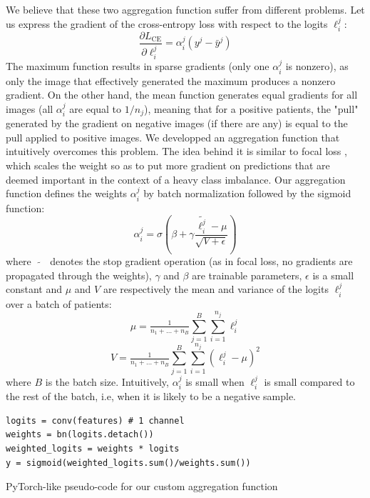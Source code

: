 \documentclass[final]{cvpr}
\begin{document}
We believe that these two aggregation function suffer from different problems. Let us express the gradient of the cross-entropy loss with respect to the logits $\ell_i^j$:
$$\frac{\partial L_{\text{CE}}}{\partial \ell_i^j} = \alpha_i^j \left(y^j - \bar{y}^j\right)$$
The maximum function results in sparse gradients (only one $\alpha_i^j$ is nonzero), as only the image that effectively generated the maximum produces a nonzero gradient. On the other hand, the mean function generates equal gradients for all images (all $\alpha_i^j$ are equal to $1/n_j$), meaning that for a positive patients, the "pull" generated by the gradient on negative images (if there are any) is equal to the pull applied to positive images. We developped an aggregation function that intuitively overcomes this problem.
The idea behind it is similar to focal loss \cite{focal}, which scales the weight so as to put more gradient on predictions that are deemed important in the context of a heavy class imbalance.
Our aggregation function defines the weights $\alpha_i^j$ by batch normalization \cite{bn} followed by the sigmoid function:
$$ \alpha_i^j = \sigma\left(\beta + \gamma \frac{\widetilde{\ell_i^j} - \mu}{\sqrt{V+\epsilon}}\right) $$
where $\; \widetilde{\text{ }} \;$ denotes the stop gradient operation (as in focal loss, no gradients are propagated through the weights), $\gamma$ and $\beta$ are trainable parameters, $\epsilon$ is a small constant and $\mu$ and $V$ are respectively the mean and variance of the logits $\ell_i^j$ over a batch of patients:
$$\mu = \tfrac 1 {n_1+\dots+n_B} \sum_{j=1}^{B} \sum_{i=1}^{n_j} \ell_i^j$$
$$V = \tfrac 1 {n_1+\dots+n_B} \sum_{j=1}^{B} \sum_{i=1}^{n_j} \left(\ell_i^j - \mu \right)^2$$
where $B$ is the batch size. Intuitively, $\alpha_i^j$ is small when $\ell_i^j$ is small compared to the rest of the batch, i.e, when it is likely to be a negative sample.

\begin{table}[h]
	\renewcommand\tablename{Pseudo-code}
\begin{Verbatim}[fontsize=\footnotesize, samepage=true, frame=single]
logits = conv(features) # 1 channel
weights = bn(logits.detach())
weighted_logits = weights * logits
y = sigmoid(weighted_logits.sum()/weights.sum())
\end{Verbatim}
\label{alg2}
\caption{PyTorch-like pseudo-code for our custom aggregation function}
\end{table}
\end{document}
